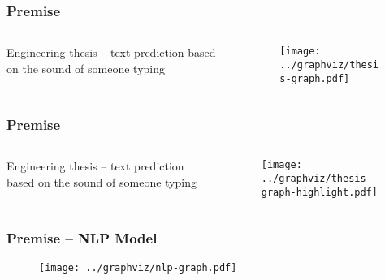 \documentclass[../main.tex]{subfiles}
\begin{document}
\begin{frame}
	\frametitle{Premise}
	\begin{columns}
		\begin{column}{.68\textwidth}
			Engineering thesis -- text prediction based on the sound of someone
			typing
		\end{column}
		\begin{column}{0.28\textwidth}
			\begin{figure}
				\texttt{[image: ../graphviz/thesis-graph.pdf]}
			\end{figure}
		\end{column}
	\end{columns}
\end{frame}

\begin{frame}
	\frametitle{Premise}
	\begin{columns}
		\begin{column}{.68\textwidth}
			Engineering thesis -- text prediction based on the sound of someone
			typing
		\end{column}
		\begin{column}{0.28\textwidth}
			\begin{figure}
				\texttt{[image: ../graphviz/thesis-graph-highlight.pdf]}
			\end{figure}
		\end{column}
	\end{columns}
\end{frame}

\begin{frame}
	\frametitle{Premise -- NLP Model}
	\begin{figure}
		\texttt{[image: ../graphviz/nlp-graph.pdf]}
	\end{figure}
\end{frame}
\end{document}
